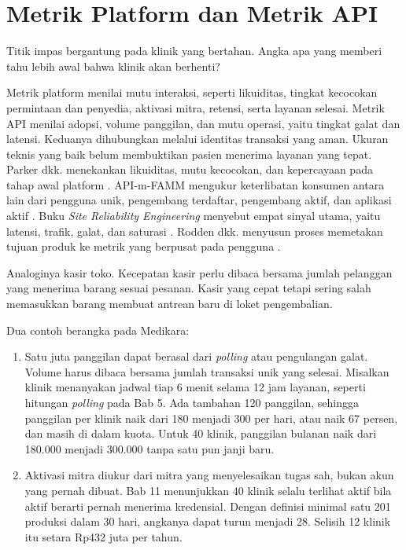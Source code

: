 \section{Metrik Platform dan Metrik API}

Titik impas bergantung pada klinik yang bertahan. Angka apa yang memberi tahu lebih awal bahwa klinik akan berhenti?

Metrik platform menilai mutu interaksi, seperti likuiditas, tingkat kecocokan permintaan dan penyedia, aktivasi mitra, retensi, serta layanan
selesai. Metrik API menilai adopsi, volume panggilan, dan mutu operasi, yaitu tingkat galat dan latensi. Keduanya dihubungkan melalui identitas transaksi yang aman.
Ukuran teknis yang baik belum membuktikan pasien menerima layanan yang tepat. Parker dkk. menekankan likuiditas, mutu kecocokan, dan kepercayaan
pada tahap awal platform \cite{parker2016platform}. API-m-FAMM mengukur keterlibatan konsumen antara lain dari pengguna unik, pengembang terdaftar,
pengembang aktif, dan aplikasi aktif \cite{mathijssen2020}. Buku \textit{Site Reliability Engineering} menyebut empat sinyal utama, yaitu
latensi, trafik, galat, dan saturasi \cite{c12-sre-monitoring}. Rodden dkk. menyusun proses memetakan tujuan produk ke metrik yang berpusat pada
pengguna \cite{c12-rodden2010}.

Analoginya kasir toko. Kecepatan kasir perlu dibaca bersama jumlah pelanggan yang menerima barang sesuai pesanan. Kasir yang cepat tetapi sering
salah memasukkan barang membuat antrean baru di loket pengembalian.

Dua contoh berangka pada Medikara:
\begin{enumerate}
  \item Satu juta panggilan dapat berasal dari \textit{polling} atau pengulangan galat. Volume harus dibaca bersama jumlah transaksi unik yang selesai.
        Misalkan klinik menanyakan jadwal tiap 6 menit selama 12 jam layanan, seperti hitungan \textit{polling} pada Bab 5. Ada tambahan 120 panggilan,
        sehingga panggilan per klinik naik dari 180 menjadi 300 per hari, atau naik 67 persen, dan masih di dalam kuota. Untuk 40 klinik, panggilan
        bulanan naik dari 180.000 menjadi 300.000 tanpa satu pun janji baru.
  \item Aktivasi mitra diukur dari mitra yang menyelesaikan tugas sah, bukan akun yang pernah dibuat. Bab 11 menunjukkan 40 klinik selalu terlihat aktif
        bila aktif berarti pernah menerima kredensial. Dengan definisi minimal satu 201 produksi dalam 30 hari, angkanya dapat turun menjadi 28. Selisih 12 klinik itu
        setara Rp432 juta per tahun.
\end{enumerate}

